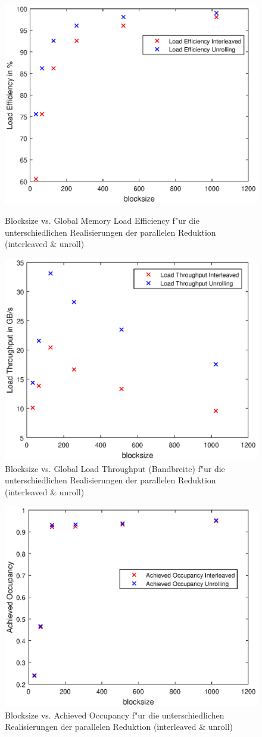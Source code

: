 \documentclass[%
	paper=A4,	%
	pagesize,	%
	DIV=calc,	%
	smallheadings,	%
	ngerman		%
]{scrartcl}
\begin{document}
\begin{figure}[!hb]
  \centering
  \includegraphics[width=.75\textwidth]{blocksize_vs_load_efficiency.eps}
  \caption{Blocksize vs. Global Memory Load Efficiency f"ur die unterschiedlichen Realisierungen der parallelen Reduktion (interleaved \& unroll)}

  \includegraphics[width=.75\textwidth]{blocksize_vs_load_throughput.eps}
  \caption{Blocksize vs. Global Load Throughput (Bandbreite) f"ur die unterschiedlichen Realisierungen der parallelen Reduktion (interleaved \& unroll)}
\end{figure}
\begin{figure}
  \centering
  \includegraphics[width=.75\textwidth]{blocksize_vs_achieved_occ.eps}
  \caption{Blocksize vs. Achieved Occupancy f"ur die unterschiedlichen Realisierungen der parallelen Reduktion (interleaved \& unroll)}
\end{figure}
\end{document}
